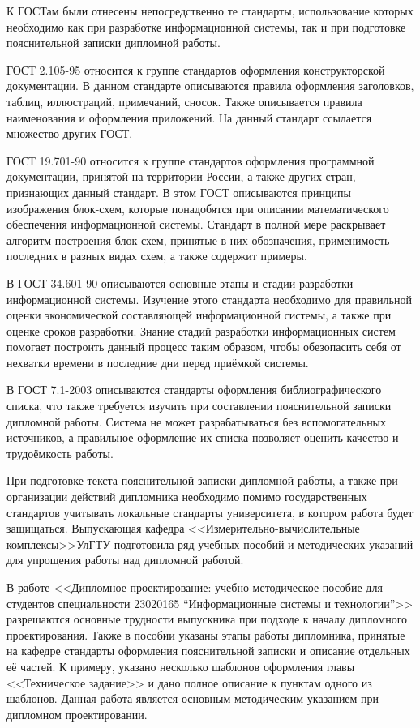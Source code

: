 К ГОСТам были отнесены непосредственно те стандарты, использование которых необходимо как при разработке информационной системы, так и при подготовке пояснительной записки дипломной работы.

ГОСТ 2.105-95 относится к группе стандартов оформления конструкторской документации.
В данном стандарте описываются правила оформления заголовков, таблиц, иллюстраций, примечаний, сносок.
Также описывается правила наименования и оформления приложений.
На данный стандарт ссылается множество других ГОСТ.

ГОСТ 19.701-90 относится к группе стандартов оформления программной документации, принятой на территории России, а также других стран, признающих данный стандарт.
В этом ГОСТ описываются принципы изображения блок-схем, которые понадобятся при описании математического обеспечения информационной системы.
Стандарт в полной мере раскрывает алгоритм построения блок-схем, принятые в них обозначения, применимость последних в разных видах схем, а также содержит примеры.

В ГОСТ 34.601-90 описываются основные этапы и стадии разработки информационной системы.
Изучение этого стандарта необходимо для правильной оценки экономической составляющей информационной системы, а также при оценке сроков разработки.
Знание стадий разработки информационных систем помогает построить данный процесс таким образом, чтобы обезопасить себя от нехватки времени в последние дни перед приёмкой системы.

В ГОСТ 7.1-2003 описываются стандарты оформления библиографического списка, что также требуется изучить при составлении пояснительной записки дипломной работы.
Система не может разрабатываться без вспомогательных источников, а правильное оформление их списка позволяет оценить качество и трудоёмкость работы.

При подготовке текста пояснительной записки дипломной работы, а также при организации действий дипломника необходимо помимо государственных стандартов учитывать локальные стандарты университета, в котором работа будет защищаться.
Выпускающая кафедра <<Измерительно-вычислительные комплексы>>\linebreak УлГТУ подготовила ряд учебных пособий и методических указаний для упрощения работы над дипломной работой.

В работе <<Дипломное проектирование: учебно-методическое пособие для студентов специальности 23020165 “Информационные системы и технологии”>> разрешаются основные трудности выпускника при подходе к началу дипломного проектирования.
Также в пособии указаны этапы работы дипломника, принятые на кафедре стандарты оформления пояснительной записки и описание отдельных её частей.
К примеру, указано несколько шаблонов оформления главы <<Техническое задание>> и дано полное описание к пунктам одного из шаблонов. 
Данная работа является основным методическим указанием при дипломном проектировании.

